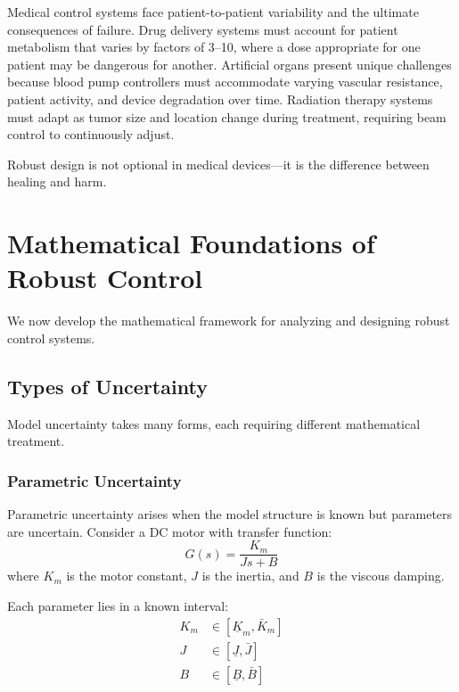 Medical control systems face patient-to-patient variability and the ultimate consequences of failure. Drug delivery systems must account for patient metabolism that varies by factors of 3--10, where a dose appropriate for one patient may be dangerous for another. Artificial organs present unique challenges because blood pump controllers must accommodate varying vascular resistance, patient activity, and device degradation over time. Radiation therapy systems must adapt as tumor size and location change during treatment, requiring beam control to continuously adjust.

Robust design is not optional in medical devices---it is the difference between healing and harm.

\section{Mathematical Foundations of Robust Control}
\label{sec:math_foundations}

We now develop the mathematical framework for analyzing and designing robust control systems.

\subsection{Types of Uncertainty}
\label{subsec:uncertainty_types}

Model uncertainty takes many forms, each requiring different mathematical treatment.

\subsubsection{Parametric Uncertainty}

Parametric uncertainty arises when the model structure is known but parameters are uncertain. Consider a DC motor with transfer function:
\begin{equation}
G(s) = \frac{K_m}{Js + B}
\label{eq:dc_motor}
\end{equation}
where $K_m$ is the motor constant, $J$ is the inertia, and $B$ is the viscous damping.

Each parameter lies in a known interval:
\begin{align}
K_m &\in [\underline{K}_m, \bar{K}_m] \\
J &\in [\underline{J}, \bar{J}] \\
B &\in [\underline{B}, \bar{B}]
\end{align}


